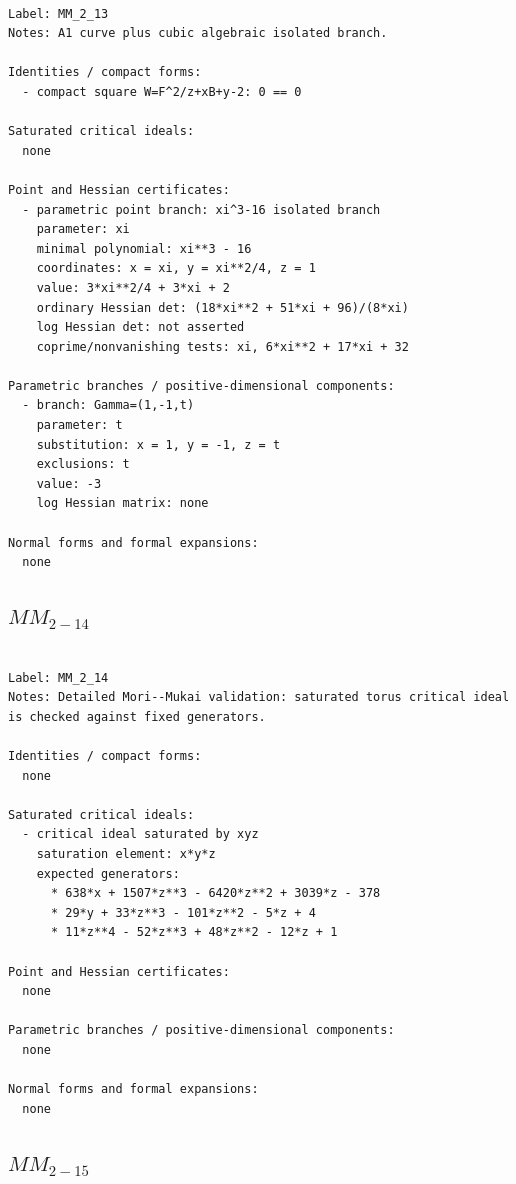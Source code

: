 \documentclass[10pt,a4paper]{article}
\begin{document}
\begin{lstlisting}

Label: MM_2_13
Notes: A1 curve plus cubic algebraic isolated branch.

Identities / compact forms:
  - compact square W=F^2/z+xB+y-2: 0 == 0

Saturated critical ideals:
  none

Point and Hessian certificates:
  - parametric point branch: xi^3-16 isolated branch
    parameter: xi
    minimal polynomial: xi**3 - 16
    coordinates: x = xi, y = xi**2/4, z = 1
    value: 3*xi**2/4 + 3*xi + 2
    ordinary Hessian det: (18*xi**2 + 51*xi + 96)/(8*xi)
    log Hessian det: not asserted
    coprime/nonvanishing tests: xi, 6*xi**2 + 17*xi + 32

Parametric branches / positive-dimensional components:
  - branch: Gamma=(1,-1,t)
    parameter: t
    substitution: x = 1, y = -1, z = t
    exclusions: t
    value: -3
    log Hessian matrix: none

Normal forms and formal expansions:
  none

\end{lstlisting}

\subsection*{$ MM_{2-14} $}

\begin{lstlisting}

Label: MM_2_14
Notes: Detailed Mori--Mukai validation: saturated torus critical ideal is checked against fixed generators.

Identities / compact forms:
  none

Saturated critical ideals:
  - critical ideal saturated by xyz
    saturation element: x*y*z
    expected generators:
      * 638*x + 1507*z**3 - 6420*z**2 + 3039*z - 378
      * 29*y + 33*z**3 - 101*z**2 - 5*z + 4
      * 11*z**4 - 52*z**3 + 48*z**2 - 12*z + 1

Point and Hessian certificates:
  none

Parametric branches / positive-dimensional components:
  none

Normal forms and formal expansions:
  none

\end{lstlisting}

\subsection*{$ MM_{2-15} $}
\end{document}
